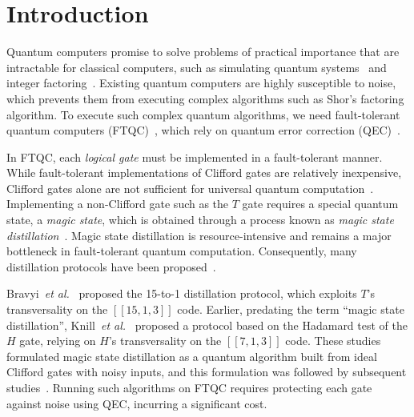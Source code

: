 \section{Introduction}
\label{sec:introduction}
Quantum computers promise to solve problems of practical importance that are intractable for classical computers, such as simulating quantum systems~\cite{lloyd1996universal} and integer factoring~\cite{Shor1994Factoring}.
Existing quantum computers are highly susceptible to noise, which prevents them from executing complex algorithms such as Shor's factoring algorithm.
To execute such complex quantum algorithms, we need fault-tolerant quantum computers (FTQC)~\cite{shor1996fault}, which rely on quantum error correction (QEC)~\cite{shor1995scheme, Steane1996ErrorCorrecting}.

In FTQC, each \textit{logical gate} must be implemented in a fault-tolerant manner.
While fault-tolerant implementations of Clifford gates are relatively inexpensive, Clifford gates alone are not sufficient for universal quantum computation~\cite{gottesman1998heisenberg}.
Implementing a non-Clifford gate such as the $T$ gate requires a special quantum state, a \textit{magic state}, which is obtained through a process known as \textit{magic state distillation}~\cite{Bravyi2005}.
Magic state distillation is resource-intensive and remains a major bottleneck in fault-tolerant quantum computation.
Consequently, many distillation protocols have been proposed~\cite{Bravyi2005, knill1998resilient, bravyi2012magic, meier2012magic, Goto2016Minimizing, Campbell2017Unified, Gidney2019EfficientMagicState, Litinski2019GameOfSurfaceCodes, Litinski2019magicstate, chamberland2020very, itogawa2025efficient, Hirano2024Leveraging, Gidney2024MagicStateCultivation, vaknin2025magic, chen2025efficient, sahay2025fold, claes2025cultivating}.

Bravyi~\textit{et al.}~\cite{Bravyi2005} proposed the 15-to-1 distillation protocol, which exploits $T$'s transversality on the $[[15, 1, 3]]$ code.
Earlier, predating the term ``magic state distillation'', Knill~\textit{et al.}~\cite{knill1998resilient} proposed a protocol based on the Hadamard test of the $H$ gate, relying on $H$'s transversality on the $[[7, 1, 3]]$ code.
These studies formulated magic state distillation as a quantum algorithm built from ideal Clifford gates with noisy inputs, and this formulation was followed by subsequent studies~\cite{bravyi2012magic, meier2012magic, Campbell2017Unified, Gidney2019EfficientMagicState, Litinski2019GameOfSurfaceCodes}.
Running such algorithms on FTQC requires protecting each gate against noise using QEC, incurring a significant cost.

